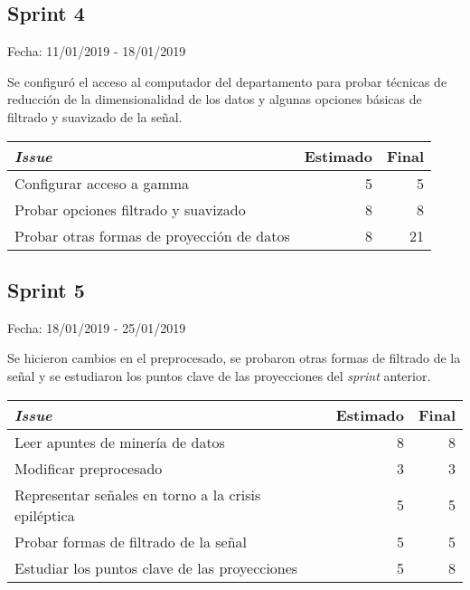 \subsection{Sprint 4}

Fecha: 11/01/2019 - 18/01/2019

Se configuró el acceso al computador del departamento para probar técnicas de reducción de la dimensionalidad de los datos y algunas opciones básicas de filtrado y suavizado de la señal. 

\begin{table}[h]
	\begin{tabularx}{\textwidth}{|Xrr|}
		\hline \textbf{\textit{Issue}} & \textbf{Estimado} & \textbf{Final}\\
		\hline Configurar acceso a gamma & 5 & 5 \\
		\hline Probar opciones filtrado y suavizado & 8 & 8 \\
		\hline Probar otras formas de proyección de datos & 8 & 21 \\
		\hline
	\end{tabularx}
\end{table}

\subsection{Sprint 5}

Fecha: 18/01/2019 - 25/01/2019

Se hicieron cambios en el preprocesado, se probaron otras formas de filtrado de la señal y se estudiaron los puntos clave de las proyecciones del \textit{sprint} anterior. 

\begin{table}[h]
	\begin{tabularx}{\textwidth}{|Xrr|}
		\hline \textbf{\textit{Issue}} & \textbf{Estimado} & \textbf{Final}\\
		\hline Leer apuntes de minería de datos & 8 & 8 \\
		\hline Modificar preprocesado & 3 & 3 \\
		\hline Representar señales en torno a la crisis epiléptica & 5 & 5 \\
		\hline Probar formas de filtrado de la señal & 5 & 5 \\
		\hline Estudiar los puntos clave de las proyecciones & 5 & 8 \\
		\hline
	\end{tabularx}
\end{table}

